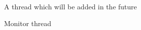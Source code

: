 \begin{DoxyItemize}
\begin{DoxyItemize}
\end{DoxyItemize}
\item A thread which will be added in the future
\begin{DoxyItemize}
\item Monitor thread 
\end{DoxyItemize}
\end{DoxyItemize}